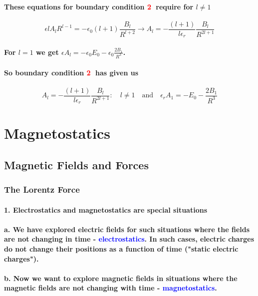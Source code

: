 \documentclass{article}
\begin{document}
\paragraph{These equations for boundary condition \textcolor{red}{\textcircled{2}} require for $l\neq 1$}
\begin{equation*}
    \epsilon lA_lR^{l-1}=-\epsilon_0(l+1)\frac{B_l}{R^{l+2}}\rightarrow A_l=-\frac{(l+1)}{l\epsilon_r}\frac{B_l}{R^{2l+1}}
\end{equation*}
\paragraph{For $l=1$ we get $\epsilon A_l=-\epsilon_0E_0-\epsilon_0\frac{2B_1}{R^3}$.}
\paragraph{So boundary condition \textcolor{red}{\textcircled{2}} has given us}
\begin{equation*}
    A_l=-\frac{(l+1)}{l\epsilon_r}\frac{B_l}{R^{2l+1}}:\quad l\neq 1\quad \text{and} \quad\epsilon_rA_1=-E_0-\frac{2B_1}{R^3}
\end{equation*}
\section{Magnetostatics}
\subsection{Magnetic Fields and Forces}
\subsubsection{The Lorentz Force}
\paragraph{1. Electrostatics and magnetostatics are special situations}
\paragraph{\indent a. We have explored electric fields for such situations where the fields are not changing in time - \textcolor{blue}{electrostatics}. In such cases, electric charges do not change their positions as a function of time ("static electric charges").}
\paragraph{\indent b. Now we want to explore magnetic fields in situations where the magnetic fields are not changing with time - \textcolor{blue}{magnetostatics}.}
\end{document}
